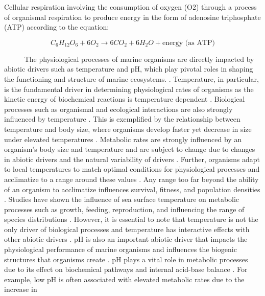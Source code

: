 \documentclass[
]{article}
\begin{document}
Cellular respiration involving the consumption of oxygen (O2) through a
process of organismal respiration to produce energy in the form of
adenosine triphosphate (ATP) \cite{babcock1992oxygen} according to the
equation:

\[
C_6H_{12}O_6 + 6O_2 \rightarrow 6CO_2 + 6H_2O + \text{energy (as ATP)}
\]

~~~~~ The physiological processes of marine organisms are directly
impacted by abiotic drivers such as temperature and pH, which play
pivotal roles in shaping the functioning and structure of marine
ecosystems. \citep{woodwell1970effects}. Temperature, in particular, is
the fundamental driver in determining physiological rates of organisms
as the kinetic energy of biochemical reactions is temperature dependent
\citep{levins1968evolution, somero2002thermal, portner2012integrating}.
Biological processes such as organismal and ecological interactions are
also strongly influenced by temperature
\citep{hochachka2002biochemical}. This is exemplified by the
relationship between temperature and body size, where organisms develop
faster yet decrease in size under elevated temperatures
\citep{elahi2020historical}. Metabolic rates are strongly influenced by
an organism's body size and temperature and are subject to change due to
changes in abiotic drivers and the natural variability of drivers
\citep{brown2004metabolic, oconnor2007temperature}. Further, organisms
adapt to local temperatures to match optimal conditions for
physiological processes and acclimatize to a range around these values
\citep{sinclair2016can}. Any range too far beyond the ability of an
organism to acclimatize influences survival, fitness, and population
densities \citep{hochachka2002biochemical}. Studies have shown the
influence of sea surface temperature on metabolic processes such as
growth, feeding, reproduction, and influencing the range of species
distributions
\citep{kordas2011community, sanford2002feeding, pinsky2013marine}.
However, it is essential to note that temperature is not the only driver
of biological processes and temperature has interactive effects with
other abiotic drivers \citep{darling2008quantifying}. pH is also an
important abiotic driver that impacts the physiological performance of
marine organisms and influences the biogenic structures that organisms
create \citep{hofmann2010living}. pH plays a vital role in metabolic
processes due to its effect on biochemical pathways and internal
acid-base balance \citep{gaylord2015ocean}. For example, low pH is often
associated with elevated metabolic rates due to the increase in
\end{document}
